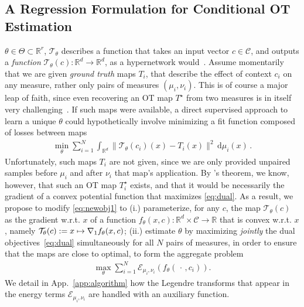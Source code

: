\subsection{A Regression Formulation for Conditional OT Estimation}
 $\theta\in\Theta\subset\mathbb{R}^r$, $\mathcal{T}_\theta$ describes a function that takes an input vector $c\in\mathcal{C}$, and outputs a \textit{function} $\mathcal{T}_\theta(c):\mathbb{R}^d\rightarrow\mathbb{R}^d$, as a hypernetwork would~\citep{ha2016hypernetworks}. Assume momentarily that we are given \textit{ground truth} maps $T_i$, that describe the effect of context $c_i$ on any measure, rather only pairs of measures $(\mu_i,\nu_i)$. This is of course a major leap of faith, since even recovering an OT map $T^\star$ from two measures is in itself very challenging~\citep{hutter2021minimax,rigollet2022sample,pooladian2021entropic}. If such maps were available, a direct supervised approach to learn a unique $\theta$ could hypothetically involve minimizing a fit function composed of losses between maps
\begin{align}\label{eq:newobj1}
\min_\theta \sum_{i=1}^N \int_{\mathbb{R}^d} \|\mathcal{T}_{\theta}(c_i)(x) - T_i(x)\|^2\, \mathrm{d}\mu_i(x)\,.
\end{align}
Unfortunately, such maps $T_i$ are not given, since we are only provided unpaired samples before $\mu_i$ and after $\nu_i$ that map's application.
By \citeauthor{Brenier1987}'s theorem, we know, however, that such an OT map $T^\star_i$ exists, and that it would be necessarily the gradient of a convex potential function that maximizes \eqref{eq:dual}. As a result, we propose to modify \eqref{eq:newobj1} to (i.) parameterize, for any $c$, the map $\mathcal{T}_\theta(c)$ as the gradient w.r.t. $x$ of a function $f_\theta(x,c):\mathbb{R}^d\times \mathcal{C}\rightarrow \mathbb{R}$ that is convex w.r.t. $x$, namely $\mathcal{T}_\theta(c) := x \mapsto \nabla_1 f_\theta(x,c)$; (ii.) estimate $\theta$ by maximizing \textit{jointly} the dual objectives~\eqref{eq:dual} simultaneously for all $N$ pairs of measures, in order to ensure that the maps are close to optimal, to form the aggregate problem
\begin{align}\label{eq:supdual} 
\textstyle \max_\theta \sum_{i=1}^N \mathcal{E}_{\mu_i,\nu_i}(f_{\theta}(\,\cdot\,, c_i)).
\end{align}
We detail in App.~\ref{app:algorithm} how the Legendre transforms that appear in the energy terms $\mathcal{E}_{\mu_i,\nu_i}$ are handled with an auxiliary function.

